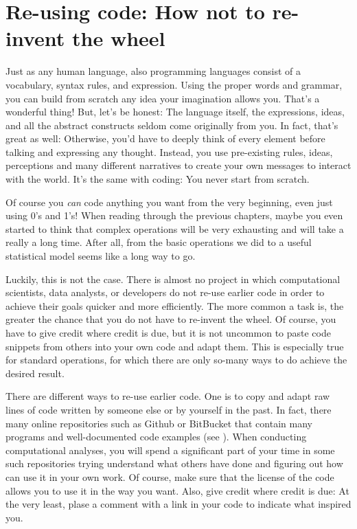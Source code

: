 \section{Re-using code: How not to re-invent the wheel}
\label{sec:code}

Just as any human language, also programming languages consist of a vocabulary, syntax rules, and expression. Using the proper words and grammar, you can build from scratch any idea your imagination allows you. That's a wonderful thing! But, let's be honest: The language itself, the expressions, ideas, and all the abstract constructs seldom come originally from you. In fact, that's great as well: Otherwise, you'd have to deeply think of every element before talking and expressing any thought. Instead, you use pre-existing rules, ideas, perceptions and many different narratives to create your own messages to interact with the world. It's the same with coding: You never start from scratch.

Of course you \emph{can} code anything you want from the very beginning, even just using 0's and 1's!
When reading through the previous chapters, maybe you even started to think that complex operations will be very exhausting and will take a really a long time. After all, from the basic operations we did to a useful statistical model seems like a long way to go.

Luckily, this is not the case.
There is almost no project in which computational scientists, data analysts, or developers do not re-use earlier code in order to achieve their goals quicker and more efficiently.
The more common a task is, the greater the chance that you do not have to re-invent the wheel.
Of course, you have to give credit where credit is due, but it is not uncommon to paste code snippets from others into your own code and adapt them. This is especially true for standard operations, for which there are only so-many ways to do achieve the desired result.

There are different ways to re-use earlier code. One is to copy and adapt raw lines of code written by someone else or by yourself in the past. In fact, there many online repositories such as Github or BitBucket that contain many programs and well-documented code examples (see ). When conducting computational analyses, you will spend a significant part of your time in some such repositories trying understand what others have done and figuring out how can use it in your own work. Of course, make sure that the license of the code allows you to use it in the way you want. Also, give credit where credit is due: At the very least, plase a comment with a link in your code to indicate what inspired you.

